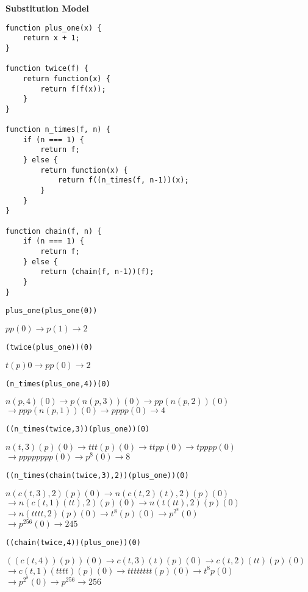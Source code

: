 \documentclass[a4paper]{article} \usepackage[backend=biber, style=numeric, sorting=none]{biblatex}
\begin{document}
\begin{multicols*}{4}
{\small\textbf{Substitution Model}}
\begin{verbatim}
function plus_one(x) {
    return x + 1;
}

function twice(f) {
    return function(x) {
        return f(f(x));
    }
}

function n_times(f, n) {
    if (n === 1) {
        return f;
    } else {
        return function(x) {
            return f((n_times(f, n-1))(x);
        }
    }
}

function chain(f, n) {
    if (n === 1) {
        return f;
    } else {
        return (chain(f, n-1))(f);
    }
}
\end{verbatim}
\par \texttt{plus\_one(plus\_one(0))}
\par $pp(0) \rightarrow p(1) \rightarrow 2$
\\
\par \texttt{(twice(plus\_one))(0)}
\par $t(p)0 \rightarrow pp(0) \rightarrow 2$
\\
\par \texttt{(n\_times(plus\_one,4))(0)}
\par $n(p,4)(0) \rightarrow p(n(p,3))(0) \rightarrow pp(n(p,2))(0)$\\
     $\rightarrow ppp(n(p,1))(0) \rightarrow pppp(0) \rightarrow 4$
\\
\par \texttt{((n\_times(twice,3))(plus\_one))(0)}
\par $n(t,3)(p)(0) \rightarrow ttt(p)(0) \rightarrow ttpp(0) \rightarrow tpppp(0)$\\
     $\rightarrow pppppppp(0) \rightarrow p^8(0) \rightarrow 8$
\\
\par \texttt{((n\_times(chain(twice,3),2))(plus\_one))(0)}
\par $n(c(t,3),2)(p)(0) \rightarrow n(c(t,2)(t),2)(p)(0)$\\
     $\rightarrow n(c(t,1)(tt), 2)(p)(0) \rightarrow n(t(tt), 2)(p)(0)$\\
     $\rightarrow n(tttt, 2)(p)(0) \rightarrow t^8(p)(0) \rightarrow p^{2^8}(0)$\\
     $\rightarrow p^{256}(0) \rightarrow 245$
\\
\par \texttt{((chain(twice,4))(plus\_one))(0)}
\par $((c(t,4))(p))(0) \rightarrow c(t,3)(t)(p)(0) \rightarrow c(t,2)(tt)(p)(0)$\\
     $\rightarrow c(t,1)(tttt)(p)(0) \rightarrow tttttttt(p)(0) \rightarrow t^8p(0)$\\
     $\rightarrow p^{2^8}(0) \rightarrow p^{256} \rightarrow 256$
\\


\end{multicols*}
\end{document}
